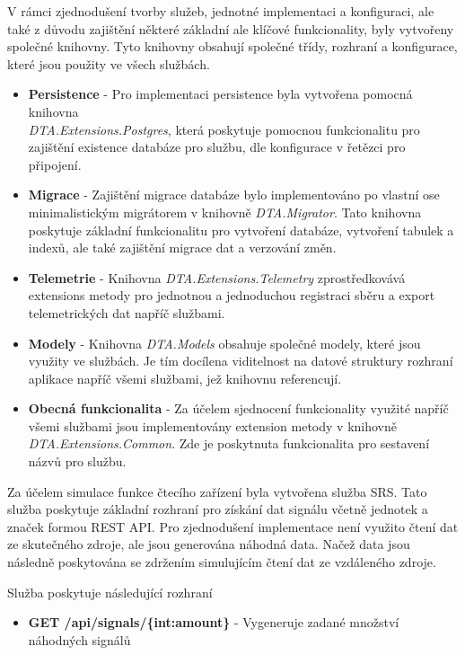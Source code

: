 
V rámci zjednodušení tvorby služeb, jednotné implementaci a konfiguraci, ale také z důvodu zajištění některé základní ale klíčové funkcionality, byly vytvořeny společné knihovny. Tyto knihovny obsahují společné třídy, rozhraní a konfigurace, které jsou použity ve všech službách.

\begin{itemize}
  \item \textbf{Persistence} - Pro implementaci persistence byla vytvořena pomocná knihovna \\ \emph{DTA.Extensions.Postgres}, která poskytuje pomocnou funkcionalitu pro zajištění existence databáze pro službu, dle konfigurace v řetězci pro připojení.
  \item \textbf{Migrace} - Zajištění migrace databáze bylo implementováno po vlastní ose minimalistickým migrátorem v knihovně \emph{DTA.Migrator}. Tato knihovna poskytuje základní funkcionalitu pro vytvoření databáze, vytvoření tabulek a indexů, ale také zajištění migrace dat a verzování změn.
  \item \textbf{Telemetrie} - Knihovna \emph{DTA.Extensions.Telemetry} zprostředkovává extensions metody pro jednotnou a jednoduchou registraci sběru a export telemetrických dat napříč službami.
  \item \textbf{Modely} - Knihovna \emph{DTA.Models} obsahuje společné modely, které jsou využity ve službách. Je tím docílena viditelnost na datové struktury rozhraní aplikace napříč všemi službami, jež knihovnu referencují.
  \item \textbf{Obecná funkcionalita} - Za účelem sjednocení funkcionality využité napříč všemi službami jsou implementovány extension metody v knihovně \emph{DTA.Extensions.Common}. Zde je poskytnuta funkcionalita pro sestavení názvů pro službu.
\end{itemize}


Za účelem simulace funkce čtecího zařízení byla vytvořena služba SRS. Tato služba poskytuje základní rozhraní pro získání dat signálu včetně jednotek a značek formou REST API. Pro zjednodušení implementace není využito čtení dat ze skutečného zdroje, ale jsou generována náhodná data. Načež data jsou následně poskytována se zdržením simulujícím čtení dat ze vzdáleného zdroje.

Služba poskytuje následující rozhraní

\begin{itemize}
    \item \textbf{GET /api/signals/\{int:amount\}} - Vygeneruje zadané množství náhodných signálů
\end{itemize}

